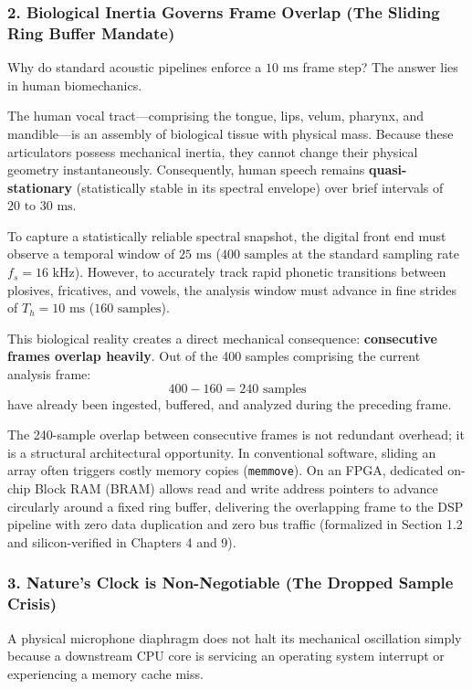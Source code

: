 \documentclass[11pt,a4paper]{article}
\begin{document}
\subsubsection*{2. Biological Inertia Governs Frame Overlap (The Sliding Ring Buffer Mandate)}
Why do standard acoustic pipelines enforce a $10\text{ ms}$ frame step? The answer lies in human biomechanics.

The human vocal tract---comprising the tongue, lips, velum, pharynx, and mandible---is an assembly of biological tissue with physical mass. Because these articulators possess mechanical inertia, they cannot change their physical geometry instantaneously. Consequently, human speech remains \textbf{quasi-stationary} (statistically stable in its spectral envelope) over brief intervals of $20\text{ to }30\text{ ms}$.

To capture a statistically reliable spectral snapshot, the digital front end must observe a temporal window of $25\text{ ms}$ ($400\text{ samples}$ at the standard sampling rate $f_s = 16\text{ kHz}$). However, to accurately track rapid phonetic transitions between plosives, fricatives, and vowels, the analysis window must advance in fine strides of $T_h = 10\text{ ms}$ ($160\text{ samples}$).

This biological reality creates a direct mechanical consequence: \textbf{consecutive frames overlap heavily}. Out of the 400 samples comprising the current analysis frame:
\[
400 - 160 = 240\text{ samples}
\]
have already been ingested, buffered, and analyzed during the preceding frame.

\begin{physicalinsight}
The 240-sample overlap between consecutive frames is not redundant overhead; it is a structural architectural opportunity. In conventional software, sliding an array often triggers costly memory copies (\texttt{memmove}). On an FPGA, dedicated on-chip Block RAM (BRAM) allows read and write address pointers to advance circularly around a fixed ring buffer, delivering the overlapping frame to the DSP pipeline with zero data duplication and zero bus traffic (formalized in Section 1.2 and silicon-verified in Chapters 4 and 9).
\end{physicalinsight}

\subsubsection*{3. Nature's Clock is Non-Negotiable (The Dropped Sample Crisis)}
A physical microphone diaphragm does not halt its mechanical oscillation simply because a downstream CPU core is servicing an operating system interrupt or experiencing a memory cache miss.
\end{document}
